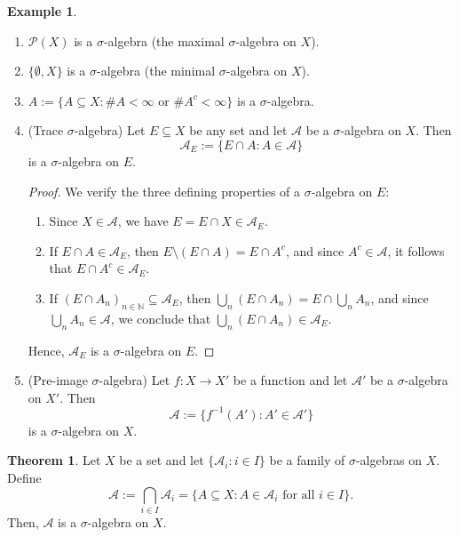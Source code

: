 \documentclass{article}
\theoremstyle{definition}
\newtheorem{theorem}{Theorem}[section]
\newtheorem{example}{Example}[section]
\begin{document}
\medskip
\begin{example}\leavevmode\
\begin{enumerate}
    \item $\mathcal{P}(X)$ is a $\sigma$-algebra (the maximal $\sigma$-algebra on $X$).
    
    \item $\{\emptyset, X\}$ is a $\sigma$-algebra (the minimal $\sigma$-algebra on $X$).
    
    \item $A := \{A \subseteq X : \#A < \infty \text{ or } \#A^c < \infty\}$ is a $\sigma$-algebra.

    \item (Trace $\sigma$-algebra) Let $E \subseteq X$ be any set and let $\mathcal{A}$ be a $\sigma$-algebra on $X$. Then
    \[
    \mathcal{A}_E := \{E \cap A : A \in \mathcal{A}\}
    \]
    is a $\sigma$-algebra on $E$.

   \begin{proof}
We verify the three defining properties of a $\sigma$-algebra on $E$:

\begin{enumerate}
    \item Since $X \in \mathcal{A}$, we have \( E = E \cap X \in \mathcal{A}_E \).
    \item If \( E \cap A \in \mathcal{A}_E \), then \( E \setminus (E \cap A) = E \cap A^c \), and since \( A^c \in \mathcal{A} \), it follows that \( E \cap A^c \in \mathcal{A}_E \).
    \item If \( (E \cap A_n)_{n \in \mathbb{N}} \subseteq \mathcal{A}_E \), then \( \bigcup_{n} (E \cap A_n) = E \cap \bigcup_{n} A_n \), and since \( \bigcup_n A_n \in \mathcal{A} \), we conclude that \( \bigcup_n (E \cap A_n) \in \mathcal{A}_E \).
\end{enumerate}
Hence, $\mathcal{A}_E$ is a $\sigma$-algebra on $E$.
\end{proof}

    \item (Pre-image $\sigma$-algebra) Let $f : X \to X'$ be a function and let $\mathcal{A}'$ be a $\sigma$-algebra on $X'$. Then
    \[
    \mathcal{A} := \{f^{-1}(A') : A' \in \mathcal{A}'\}
    \]
    is a $\sigma$-algebra on $X$.
\end{enumerate}
\end{example}


\medskip
\begin{theorem}
Let $X$ be a set and let $\{\mathcal{A}_i : i \in I\}$ be a family of $\sigma$-algebras on $X$. Define
\[
\mathcal{A} := \bigcap_{i \in I} \mathcal{A}_i = \{ A \subseteq X : A \in \mathcal{A}_i \text{ for all } i \in I \}.
\]
Then, $\mathcal{A}$ is a $\sigma$-algebra on $X$.
\end{theorem}
\end{document}
